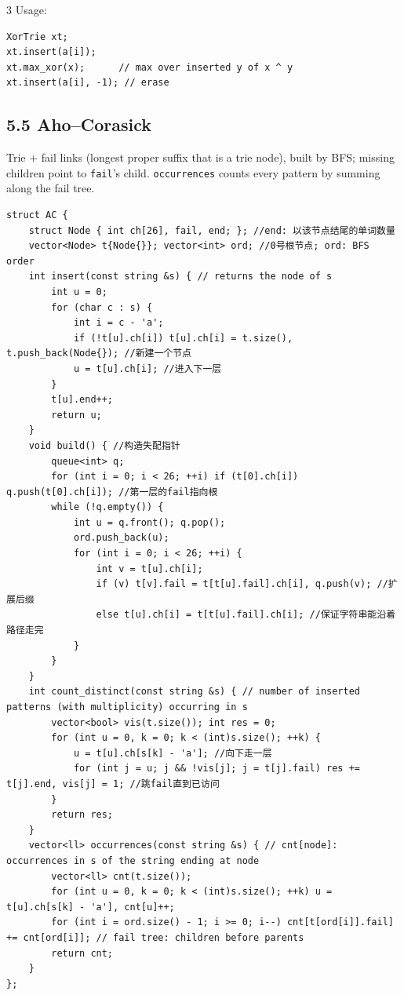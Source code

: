 \documentclass[8pt]{extarticle}
\begin{document}
\begin{multicols*}{3}
Usage:

\begin{lstlisting}
XorTrie xt;
xt.insert(a[i]);
xt.max_xor(x);      // max over inserted y of x ^ y
xt.insert(a[i], -1); // erase
\end{lstlisting}

\subsection*{5.5 Aho--Corasick}

Trie + fail links (longest proper suffix that is a trie node), built by BFS; missing children point to \texttt{fail}'s child. \texttt{occurrences} counts every pattern by summing along the fail tree.

\begin{lstlisting}
struct AC {
    struct Node { int ch[26], fail, end; }; //end: 以该节点结尾的单词数量
    vector<Node> t{Node{}}; vector<int> ord; //0号根节点; ord: BFS order
    int insert(const string &s) { // returns the node of s
        int u = 0;
        for (char c : s) {
            int i = c - 'a';
            if (!t[u].ch[i]) t[u].ch[i] = t.size(), t.push_back(Node{}); //新建一个节点
            u = t[u].ch[i]; //进入下一层
        }
        t[u].end++;
        return u;
    }
    void build() { //构造失配指针
        queue<int> q;
        for (int i = 0; i < 26; ++i) if (t[0].ch[i]) q.push(t[0].ch[i]); //第一层的fail指向根
        while (!q.empty()) {
            int u = q.front(); q.pop();
            ord.push_back(u);
            for (int i = 0; i < 26; ++i) {
                int v = t[u].ch[i];
                if (v) t[v].fail = t[t[u].fail].ch[i], q.push(v); //扩展后缀
                else t[u].ch[i] = t[t[u].fail].ch[i]; //保证字符串能沿着路径走完
            }
        }
    }
    int count_distinct(const string &s) { // number of inserted patterns (with multiplicity) occurring in s
        vector<bool> vis(t.size()); int res = 0;
        for (int u = 0, k = 0; k < (int)s.size(); ++k) {
            u = t[u].ch[s[k] - 'a']; //向下走一层
            for (int j = u; j && !vis[j]; j = t[j].fail) res += t[j].end, vis[j] = 1; //跳fail直到已访问
        }
        return res;
    }
    vector<ll> occurrences(const string &s) { // cnt[node]: occurrences in s of the string ending at node
        vector<ll> cnt(t.size());
        for (int u = 0, k = 0; k < (int)s.size(); ++k) u = t[u].ch[s[k] - 'a'], cnt[u]++;
        for (int i = ord.size() - 1; i >= 0; i--) cnt[t[ord[i]].fail] += cnt[ord[i]]; // fail tree: children before parents
        return cnt;
    }
};
\end{lstlisting}


\end{multicols*}
\end{document}
